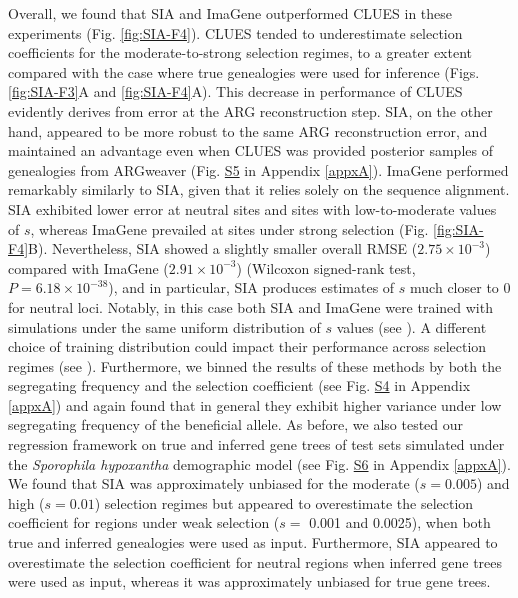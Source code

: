 Overall, we found that \ac{SIA} and ImaGene outperformed CLUES in these experiments (Fig. \ref{fig:SIA-F4}). CLUES tended to underestimate selection coefficients for the moderate-to-strong selection regimes, to a greater extent compared with the case where true genealogies were used for inference (Figs. \ref{fig:SIA-F3}A and \ref{fig:SIA-F4}A). This decrease in performance of CLUES evidently derives from error at the \ac{ARG} reconstruction step. \ac{SIA}, on the other hand, appeared to be more robust to the same \ac{ARG} reconstruction error, and maintained an advantage even when CLUES was provided posterior samples of genealogies from ARGweaver (Fig. \href{https://academic.oup.com/mbe/article/39/1/msab332/6433161#supplementary-data}{S5} in Appendix \ref{appxA}). ImaGene performed remarkably similarly to \ac{SIA}, given that it relies solely on the sequence alignment. \ac{SIA} exhibited lower error at neutral sites and sites with low-to-moderate values of $s$, whereas ImaGene prevailed at sites under strong selection (Fig. \ref{fig:SIA-F4}B). Nevertheless, \ac{SIA} showed a slightly smaller overall \ac{RMSE} ($2.75\times 10^{-3}$) compared with ImaGene ($2.91\times 10^{-3}$) (Wilcoxon signed-rank test, $P = 6.18\times 10^{-38}$), and in particular, \ac{SIA} produces estimates of $s$ much closer to 0 for neutral loci. Notably, in this case both \ac{SIA} and ImaGene were trained with simulations under the same uniform distribution of $s$ values (see ). A different choice of training distribution could impact their performance across selection regimes (see ). Furthermore, we binned the results of these methods by both the segregating frequency and the selection coefficient (see Fig. \href{https://academic.oup.com/mbe/article/39/1/msab332/6433161#supplementary-data}{S4} in Appendix \ref{appxA}) and again found that in general they exhibit higher variance under low segregating frequency of the beneficial allele. As before, we also tested our regression framework on true and inferred gene trees of test sets simulated under the \textit{Sporophila hypoxantha} demographic model (see Fig. \href{https://academic.oup.com/mbe/article/39/1/msab332/6433161#supplementary-data}{S6} in Appendix \ref{appxA}). We found that \ac{SIA} was approximately unbiased for the moderate ($s=0.005$) and high ($s=0.01$) selection regimes but appeared to overestimate the selection coefficient for regions under weak selection ($s=$ 0.001 and 0.0025), when both true and inferred genealogies were used as input. Furthermore, \ac{SIA} appeared to overestimate the selection coefficient for neutral regions when inferred gene trees were used as input, whereas it was approximately unbiased for true gene trees.


